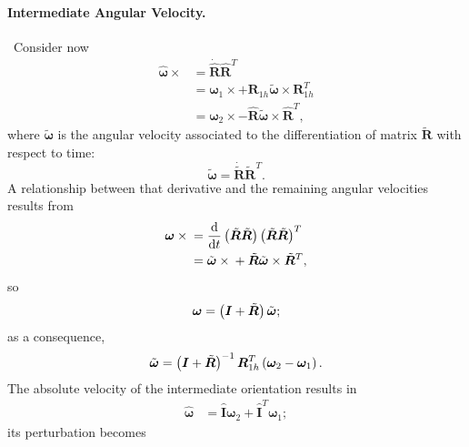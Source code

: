 \documentclass[10pt,fleqn,subeqn]{report}
\newcommand{\T}[1]{\bm{#1}}
\newcommand{\TT}[1]{\bm{#1}}
\begin{document}
\paragraph{Intermediate Angular Velocity.} \
Consider now
\begin{align}
	\hat{\T{\omega}}\times{}
	&= \dot{\hat{\T{R}}} \hat{\T{R}}^T \nonumber \\
	&= \T{\omega}_{1} \times
		+ \T{R}_{1h} \tilde{\T{\omega}}\times \T{R}_{1h}^T \nonumber \\
	&= \T{\omega}_{2} \times
		- \hat{\T{R}} \tilde{\T{\omega}}\times \hat{\T{R}}^T ,
\end{align}
where $\tilde{\T{\omega}}$ is the angular velocity associated
to the differentiation of matrix $\tilde{\T{R}}$ with respect to time:
\begin{equation}
	\tilde{\T{\omega}}
	= \dot{\tilde{\T{R}}} \tilde{\T{R}}^T .
\end{equation}
A relationship between that derivative and the remaining angular velocities
results from
\begin{align}
	\T{\omega} \times{}
	&= \frac{\mathrm{d}}{\mathrm{d}t}\plbr{
		\tilde{\T{R}} \tilde{\T{R}}
	} \plbr{
		\tilde{\T{R}} \tilde{\T{R}}
	}^T \nonumber \\
	&= \tilde{\T{\omega}} \times{}
	+ \tilde{\T{R}} \tilde{\T{\omega}} \times \tilde{\T{R}}^T ,
\end{align}
so
\begin{equation}
	\T{\omega} = \plbr{\T{I} + \tilde{\T{R}}} \tilde{\T{\omega}} ;
\end{equation}
as a consequence,
\begin{equation}
	\tilde{\T{\omega}}
	= \plbr{\T{I} + \tilde{\T{R}}}^{-1} \T{R}_{1h}^T \plbr{
		\T{\omega}_2 - \T{\omega}_1
	} .
\end{equation}
The absolute velocity of the intermediate orientation results in
\begin{align}
	\hat{\T{\omega}}
	&= \hat{\TT{I}} \T{\omega}_2
	+ \hat{\TT{I}}^T \T{\omega}_1 ;
	\label{eq:deformable-displacement-invariant-hat-omega}
\end{align}
its perturbation becomes
\end{document}
